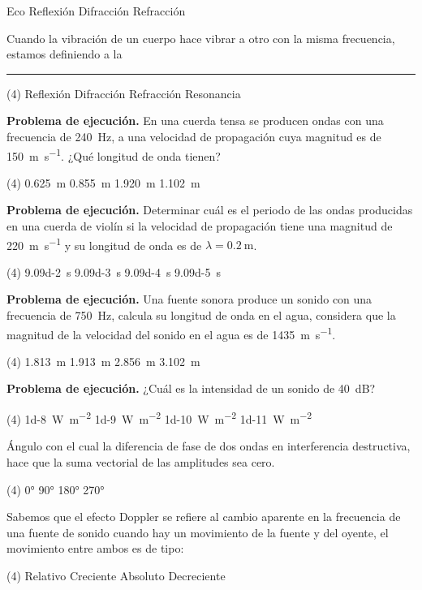 \documentclass[12pt, letter]{exam}
\begin{document}
\begin{questions}
\begin{tasks}
        \task Eco
        \task Reflexión
        \task Difracción
        \task Refracción
    \end{tasks}
    \question \label{completa_05} Cuando la vibración de un cuerpo hace vibrar a otro con la misma frecuencia, estamos definiendo a la \rule{2cm}{0.3mm}
    \begin{tasks}(4)
        \task Reflexión
        \task Difracción
        \task Refracción
        \task Resonancia
    \end{tasks}
    \question \textbf{Problema de ejecución.} En una cuerda tensa se producen ondas con una frecuencia de \SI{240}{\hertz}, a una velocidad de propagación cuya magnitud es de \SI{150}{\meter\per\second}. ¿Qué longitud de onda tienen?
     \begin{tasks}(4)
        \task \SI{0.625}{\meter}
        \task \SI{0.855}{\meter}
        \task \SI{1.920}{\meter}
        \task \SI{1.102}{\meter}
    \end{tasks}
     \question \textbf{Problema de ejecución.} Determinar cuál es el periodo de las ondas producidas en una cuerda de violín si la velocidad de propagación tiene una magnitud de \SI{220}{\meter\per\second} y su longitud de onda es de $\lambda = \SI{0.2}{\meter}$.
     \begin{tasks}(4)
        \task \SI{9.09d-2}{\second}
        \task \SI{9.09d-3}{\second}
        \task \SI{9.09d-4}{\second}
        \task \SI{9.09d-5}{\second}
     \end{tasks}
     \question \textbf{Problema de ejecución.} Una fuente sonora produce un sonido con una frecuencia de \SI{750}{\hertz}, calcula su longitud de onda en el agua, considera que la magnitud de la velocidad del sonido en el agua es de \SI{1435}{\meter\per\second}.
     \begin{tasks}(4)
        \task \SI{1.813}{\meter}
        \task \SI{1.913}{\meter}
        \task \SI{2.856}{\meter}
        \task \SI{3.102}{\meter}
    \end{tasks}
    \question \textbf{Problema de ejecución.} ¿Cuál es la intensidad de un sonido de \SI{40}{\dB}?
    \begin{tasks}(4)
        \task \SI{1d-8}{\watt\per\square\meter}
        \task \SI{1d-9}{\watt\per\square\meter}
        \task \SI{1d-10}{\watt\per\square\meter}
        \task \SI{1d-11}{\watt\per\square\meter}
    \end{tasks}
    \question Ángulo con el cual la diferencia de fase de dos ondas en interferencia destructiva, hace que la suma vectorial de las amplitudes sea cero.
    \begin{tasks}(4)
        \task \ang{0}
        \task \ang{90}
        \task \ang{180}
        \task \ang{270}
    \end{tasks}
    \question Sabemos que el efecto Doppler se refiere al cambio aparente en la frecuencia de una fuente
    de sonido cuando hay un movimiento de la fuente y del oyente, el movimiento entre ambos es de tipo:
    \begin{tasks}(4)
        \task Relativo
        \task Creciente
        \task Absoluto
        \task Decreciente
    \end{tasks}


\end{questions}
\end{document}
